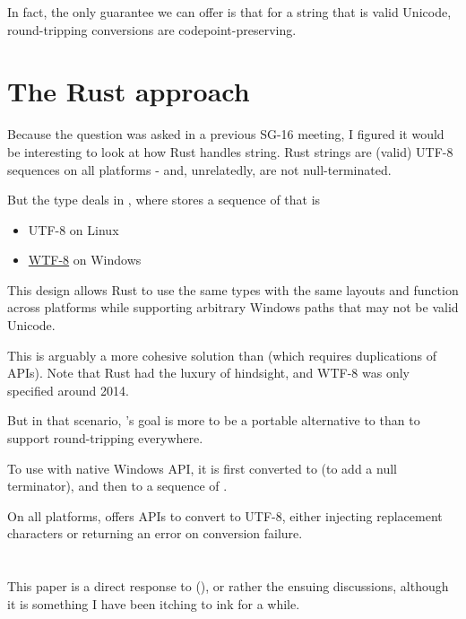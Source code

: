 \documentclass{wg21}
\begin{document}
In fact, the only guarantee we can offer is that for a string that is valid Unicode, round-tripping conversions are codepoint-preserving.


\section{The Rust approach}

Because the question was asked in a previous SG-16 meeting, I figured it would be interesting to look at how Rust handles string.
Rust strings are (valid) UTF-8 sequences on all platforms - and, unrelatedly, are not null-terminated.

But the \href{https://doc.rust-lang.org/std/path/struct.Path.html}{} type deals in \href{https://doc.rust-lang.org/std/ffi/struct.OsString.html}{}, where   stores a sequence of  that is
\begin{itemize}
\item UTF-8 on Linux
\item \href{https://simonsapin.github.io/wtf-8/}{WTF-8} on Windows
\end{itemize}

This design allows Rust to use the same types with the same layouts and function across platforms while supporting arbitrary Windows paths that
may not be valid Unicode.

This is arguably a more cohesive solution than  (which requires duplications of APIs).
Note that Rust had the luxury of hindsight, and WTF-8 was only specified around 2014.

But in that scenario, 's goal is more to be a portable alternative to 
than to support round-tripping everywhere.

To use  with native Windows API, it is first converted to  (to add a null terminator),
and then to a sequence of .

On all platforms,  offers APIs to convert to UTF-8, either injecting replacement characters or returning an error
on conversion failure.

\section{}

This paper is a direct response to  (), or rather the ensuing discussions, although it is something I have been
itching to ink for a while.
\end{document}
